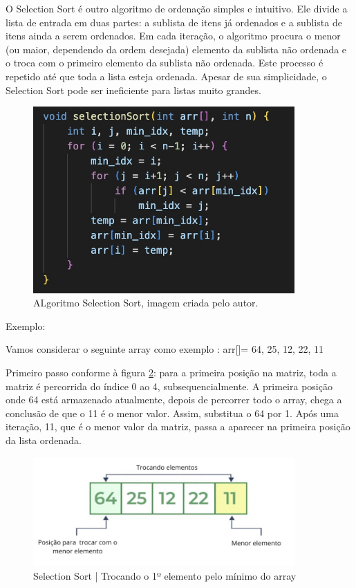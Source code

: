 O Selection Sort é outro algoritmo de ordenação simples e intuitivo. Ele divide a lista de entrada em duas partes: a sublista de itens já ordenados e a sublista de itens ainda a serem ordenados. Em cada iteração, o algoritmo procura o menor (ou maior, dependendo da ordem desejada) elemento da sublista não ordenada e o troca com o primeiro elemento da sublista não ordenada. Este processo é repetido até que toda a lista esteja ordenada. Apesar de sua simplicidade, o Selection Sort pode ser ineficiente para listas muito grandes.

 \begin{figure}[h!]
    \centering
    \includegraphics[width = 10cm]{Imagens/Selection Sort/Imagemselection.jpg}
    \caption{ALgoritmo Selection Sort, imagem criada pelo autor. }
    \label{imagem_insert}
\end{figure}

Exemplo: 

Vamos considerar o seguinte array como exemplo \cite{site2023}: arr[]= {64, 25, 12, 22, 11}
\par Primeiro passo conforme à figura \ref{fig:enter-label}: para a primeira posição na matriz, toda a matriz é percorrida do índice 0 ao 4, subsequencialmente. A primeira posição onde 64 está armazenado atualmente, depois de percorrer todo o array, chega a conclusão de que o 11 é o menor valor. Assim, substitua o 64 por 1. Após uma iteração, 11, que é o menor valor da matriz, passa a aparecer na primeira posição da lista ordenada. 

\begin{figure} [h!]
    \centering
    \includegraphics[width = 10cm]{Imagens/Selection Sort/Imagem 27-09-2023 às 16.06.jpeg}
    \caption{Selection Sort | Trocando o 1º elemento pelo mínimo do array}
    \label{fig:enter-label}
\end{figure}

